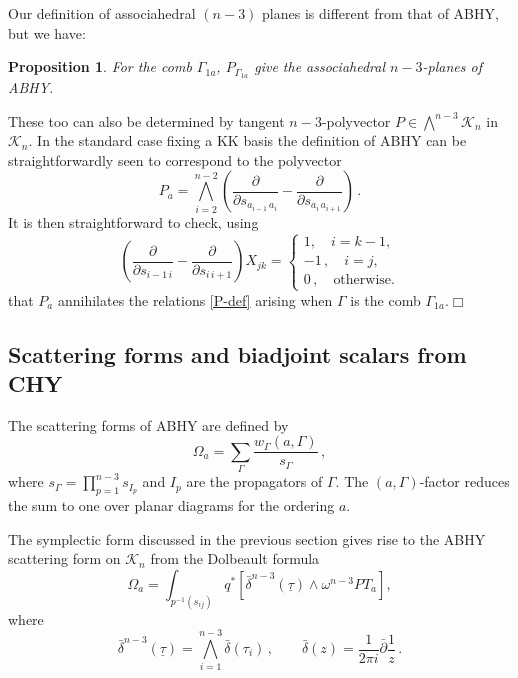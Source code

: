 \documentclass[11pt]{article}
\newcommand{\p}{\partial}
\newcommand{\cK}{\mathcal{K}}
\newcommand{\bt}{\underline{\tau}}
\newcommand{\1}{{\rm 1\hskip-0.25em I}}
\newcommand{\proof}{ \noindent {\bf Proof:} }
\newtheorem{propn}{Proposition}[section]
\begin{document}
Our definition of associahedral $(n-3)$ planes is different from that of ABHY, but we have:

\begin{propn}  For the comb $\Gamma_{1a}$, $P_{\Gamma_{1a}}$ give the associahedral $n-3$-planes of ABHY.
\end{propn}

\proof These too can also be determined by  tangent $n-3$-polyvector $P\in \bigwedge^{n-3}\cK_n$ in $\cK_n$.  In the standard case fixing a KK basis the definition of ABHY can be straightforwardly seen to correspond to the polyvector 
\begin{equation}
P_{a }=\bigwedge_{i=2}^{n-2}\left( \frac{\p}{\p s_{a_{i-1}\, a_i}}-\frac{\p}{\p s_{a_i\,a_{i+1}}}\right)\, .
\end{equation}
It is then straightforward to check, using 
\begin{equation}
\left( \frac{\p}{\p s_{i-1\, i}}-\frac{\p}{\p s_{i\,i+1}}\right)X_{jk}=\begin{cases} 1, \quad i=k-1,\\
-1\, , \quad i=j,\\
0\, , \quad \mbox{otherwise.}
\end{cases}
\end{equation}
that $P_a$ annihilates the relations \eqref{P-def} arising when $\Gamma$ is the comb $\Gamma_{1a}$.$\Box$


 



\subsection{Scattering forms and  biadjoint scalars from CHY}


The scattering forms of ABHY are defined by 
\begin{equation}
\Omega_a=\sum_{\Gamma}\frac{w_\Gamma  (a,\Gamma)}{s_\Gamma} \, ,
\end{equation}
where $s_\Gamma=\prod_{p=1}^{n-3} s_{I_p}$ and  $I_p$ are the propagators of $\Gamma$. The $(a,\Gamma)$-factor reduces the sum to one  over planar diagrams for the ordering $a$.



The symplectic form discussed in the previous section gives rise to the ABHY scattering form on $\cK_n$ from the Dolbeault formula 
\begin{equation}
\Omega_a = \int_{p^{-1}(s_{ij})} q^* \left[ \bar\delta^{n-3}(\bt) \wedge \omega^{n-3} PT_a \right],
\end{equation}
where 
\begin{equation}
\bar\delta^{n-3}(\bt)=\bigwedge_{i=1}^{n-3} \bar\delta(\tau_i)\, , \qquad \bar \delta(z)=\frac{1}{2\pi i} \bar\p\frac{1}{z}\, .
\end{equation} 
\end{document}
